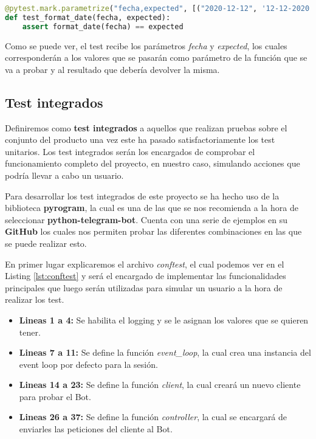\begin{lstlisting}[language=Python, caption={Ejemplo test unitario parametrizado.}, label={lst:unit-test}]
@pytest.mark.parametrize("fecha,expected", [("2020-12-12", '12-12-2020'), ("0001-07-16", '16-07-1'), ("2098-05-07", '07-05-2098')])
def test_format_date(fecha, expected):
	assert format_date(fecha) == expected
\end{lstlisting}

Como se puede ver, el test recibe los parámetros \textit{fecha} y \textit{expected}, los cuales corresponderán a los valores que se pasarán como parámetro de la función que se va a probar y al resultado que debería devolver la misma.

\subsection{Test integrados}

Definiremos como \textbf{test integrados} a aquellos que realizan pruebas sobre el conjunto del producto una vez este ha pasado satisfactoriamente los test unitarios. Los test integrados serán los encargados de comprobar el funcionamiento completo del proyecto, en nuestro caso, simulando acciones que podría llevar a cabo un usuario.

Para desarrollar los test integrados de este proyecto se ha hecho uso de la biblioteca \textbf{pyrogram}, la cual es una de las que se nos recomienda a la hora de seleccionar \textbf{python-telegram-bot}. Cuenta con una serie de ejemplos en su \textbf{GitHub} los cuales nos permiten probar las diferentes combinaciones en las que se puede realizar esto.

En primer lugar explicaremos el archivo \textit{conftest}, el cual podemos ver en el Listing \ref{lst:conftest} y será el encargado de implementar las funcionalidades principales que luego serán utilizadas para simular un usuario a la hora de realizar los test. 

\begin{itemize}
	\item \textbf{Lineas 1 a 4:} Se habilita el logging y se le asignan los valores que se quieren tener.
	\item \textbf{Lineas 7 a 11:} Se define la función \textit{event\_loop}, la cual crea una instancia del event loop por defecto para la sesión.
	\item \textbf{Lineas 14 a 23:} Se define la función \textit{client}, la cual creará un nuevo cliente para probar el Bot.
	\item \textbf{Lineas 26 a 37:} Se define la función \textit{controller}, la cual se encargará de enviarles las peticiones del cliente al Bot.
\end{itemize}

